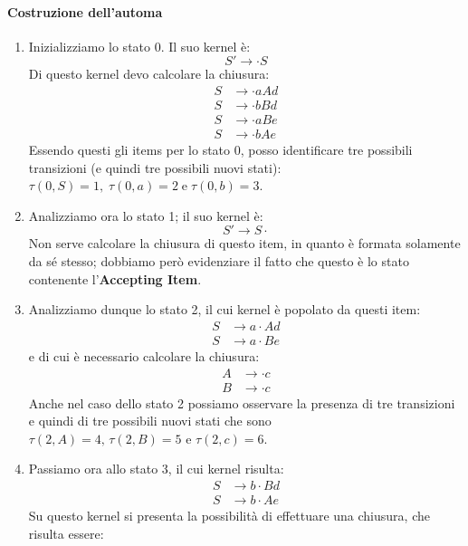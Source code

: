 \documentclass[class=book, crop=false, oneside, 12pt]{standalone}
\begin{document}
\paragraph{Costruzione dell'automa}
\begin{enumerate}
    \item Inizializziamo lo stato 0. Il suo kernel è:
    \begin{equation*}
        S' \to \cdot S
    \end{equation*}
    Di questo kernel devo calcolare la chiusura:
    \begin{align*}
        S &\to \cdot aAd \\
    	S &\to \cdot bBd \\
    	S &\to \cdot aBe \\
    	S &\to \cdot bAe
    \end{align*}
    Essendo questi gli items per lo stato 0, posso identificare tre possibili transizioni (e quindi tre possibili nuovi stati): \(\tau(0,S)=1, \; \tau(0,a)=2 \; \textrm{e} \; \tau(0,b)=3\).
    \item Analizziamo ora lo stato 1; il suo kernel è:
    \begin{equation*}
        S' \to S \cdot    
    \end{equation*}
    Non serve calcolare la chiusura di questo item, in quanto è formata solamente da sé stesso; dobbiamo però evidenziare il fatto che questo è lo stato contenente l'\textbf{Accepting Item}.
    \item Analizziamo dunque lo stato 2, il cui kernel è popolato da questi item:
    \begin{align*}
        S &\to a \cdot Ad \\
        S &\to a \cdot Be
    \end{align*}
    e di cui è necessario calcolare la chiusura:
    \begin{align*}
        A &\to \cdot c \\
        B &\to \cdot c
    \end{align*}
    Anche nel caso dello stato 2 possiamo osservare la presenza di tre transizioni e quindi di tre possibili nuovi stati che sono \(\tau(2,A)=4 \textrm{, } \tau(2,B)=5 \textrm{ e } \tau(2,c)=6\).
    \item Passiamo ora allo stato 3, il cui kernel risulta:
    \begin{align*}
        S &\to b \cdot Bd \\
        S &\to b \cdot Ae
    \end{align*}
    Su questo kernel si presenta la possibilità di effettuare una chiusura, che risulta essere:

\end{enumerate}
\end{document}

